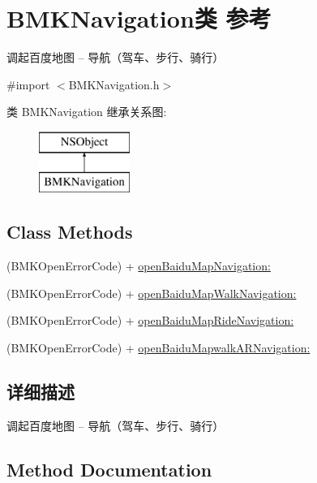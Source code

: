 \hypertarget{interface_b_m_k_navigation}{}\section{B\+M\+K\+Navigation类 参考}
\label{interface_b_m_k_navigation}


调起百度地图 -- 导航（驾车、步行、骑行）  




{\ttfamily \#import $<$B\+M\+K\+Navigation.\+h$>$}

类 B\+M\+K\+Navigation 继承关系图\+:\begin{figure}[H]
\begin{center}
\leavevmode
\includegraphics[height=2.000000cm]{interface_b_m_k_navigation}
\end{center}
\end{figure}
\subsection*{Class Methods}
\begin{DoxyCompactItemize}
\item 
(B\+M\+K\+Open\+Error\+Code) + \hyperlink{interface_b_m_k_navigation_a32f3aad5b3ac26b98bb794297c9aef3e}{open\+Baidu\+Map\+Navigation\+:}
\item 
(B\+M\+K\+Open\+Error\+Code) + \hyperlink{interface_b_m_k_navigation_aaf2588ccb6f630ed3e36b1eee2f5b767}{open\+Baidu\+Map\+Walk\+Navigation\+:}
\item 
(B\+M\+K\+Open\+Error\+Code) + \hyperlink{interface_b_m_k_navigation_acf2e5fac7c35c78f2ffd79b873cf4bb8}{open\+Baidu\+Map\+Ride\+Navigation\+:}
\item 
(B\+M\+K\+Open\+Error\+Code) + \hyperlink{interface_b_m_k_navigation_a6ff7c7523d54b0d84c73ae6ea4198add}{open\+Baidu\+Mapwalk\+A\+R\+Navigation\+:}
\end{DoxyCompactItemize}


\subsection{详细描述}
调起百度地图 -- 导航（驾车、步行、骑行） 

\subsection{Method Documentation}
\hypertarget{interface_b_m_k_navigation_a32f3aad5b3ac26b98bb794297c9aef3e}{}
